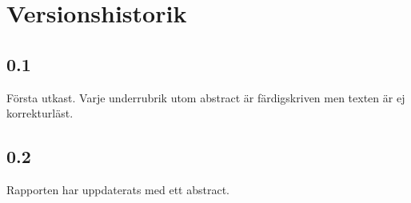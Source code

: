 \section*{Versionshistorik}
\subsection*{0.1}
Första utkast. Varje underrubrik utom abstract är färdigskriven men texten är ej korrekturläst.

\subsection*{0.2}
Rapporten har uppdaterats med ett abstract.
